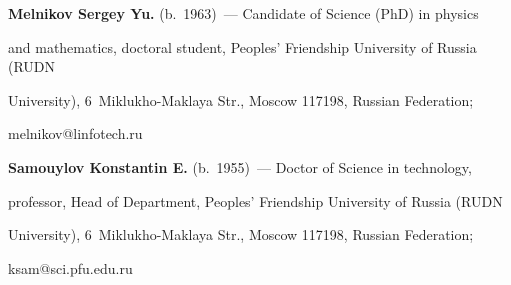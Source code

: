\Contr





\noindent


\textbf{Melnikov Sergey Yu.} (b.\ 1963)~--- Candidate of Science (PhD) in physics 


and mathematics, doctoral student, Peoples' Friendship University of Russia (RUDN 


University), 6~Miklukho-Maklaya Str., Moscow 117198, Russian Federation; 


\mbox{melnikov@linfotech.ru}





\vspace*{3pt}





\noindent


\textbf{Samouylov Konstantin E.} (b.\ 1955)~--- Doctor of Science in technology, 


professor, Head of Department, Peoples' Friendship University of Russia (RUDN 


University), 6~Miklukho-Maklaya Str., Moscow 117198, Russian Federation; 


\mbox{ksam@sci.pfu.edu.ru}








\label{end\stat}





\renewcommand{\bibname}{\protect\rm Литература} 


